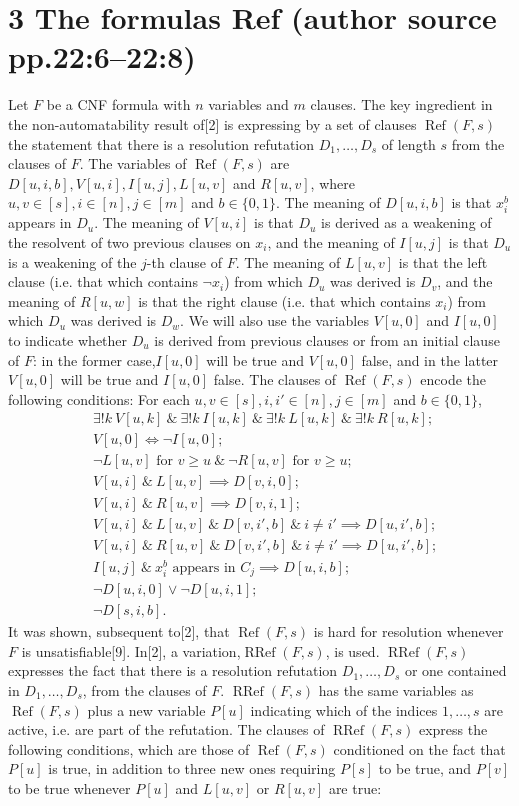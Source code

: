 \documentclass[10pt,a4paper]{article}
\newcommand{\RRef}{\operatorname{RRef}}
\renewcommand{\Ref}{\operatorname{Ref}}
\newcommand{\bits}{\{0,1\}}
\begin{document}
\section*{3 The formulas Ref (author source pp.22:6--22:8)}
Let $F$ be a CNF formula with $n$ variables and $m$ clauses. The key ingredient in the non-automatability result of[2] is expressing by a set of clauses $\Ref(F,s)$ the statement that there is a resolution refutation $D_1,\ldots,D_s$ of length $s$ from the clauses of $F$.
The variables of $\Ref(F,s)$ are $D[u,i,b],V[u,i],I[u,j],L[u,v]$ and $R[u,v]$, where $u,v\in[s],i\in[n],j\in[m]$ and $b\in\bits$. The meaning of $D[u,i,b]$ is that $x_i^b$ appears in $D_u$. The meaning of $V[u,i]$ is that $D_u$ is derived as a weakening of the resolvent of two previous clauses on $x_i$, and the meaning of $I[u,j]$ is that $D_u$ is a weakening of the $j$-th clause of $F$. The meaning of $L[u,v]$ is that the left clause (i.e. that which contains $\neg x_i$) from which $D_u$ was derived is $D_v$, and the meaning of $R[u,w]$ is that the right clause (i.e. that which contains $x_i$) from which $D_u$ was derived is $D_w$. We will also use the variables $V[u,0]$ and $I[u,0]$ to indicate whether $D_u$ is derived from previous clauses or from an initial clause of $F$: in the former case,$I[u,0]$ will be true and $V[u,0]$ false, and in the latter $V[u,0]$ will be true and $I[u,0]$ false. The clauses of $\Ref(F,s)$ encode the following conditions: For each $u,v\in[s],i,i'\in[n],j\in[m]$ and $b\in\bits$,
\begin{align*}
&\exists!k\ V[u,k]\ \&\ \exists!k\ I[u,k]\ \&\ \exists!k\ L[u,k]\ \&\ \exists!k\ R[u,k];\tag{3.1}\\
&V[u,0]\iff\neg I[u,0];\tag{3.2}\\
&\neg L[u,v]\text{ for }v\ge u\ \&\ \neg R[u,v]\text{ for }v\ge u;\tag{3.3}\\
&V[u,i]\ \&\ L[u,v]\implies D[v,i,0];\tag{3.4}\\
&V[u,i]\ \&\ R[u,v]\implies D[v,i,1];\tag{3.5}\\
&V[u,i]\ \&\ L[u,v]\ \&\ D[v,i',b]\ \&\ i\ne i'\implies D[u,i',b];\tag{3.6}\\
&V[u,i]\ \&\ R[u,v]\ \&\ D[v,i',b]\ \&\ i\ne i'\implies D[u,i',b];\tag{3.7}\\
&I[u,j]\ \&\ x_i^b\text{ appears in }C_j\implies D[u,i,b];\tag{3.8}\\
&\neg D[u,i,0]\vee\neg D[u,i,1];\tag{3.9}\\
&\neg D[s,i,b].\tag{3.10}
\end{align*}
It was shown, subsequent to[2], that $\Ref(F,s)$ is hard for resolution whenever $F$ is unsatisfiable[9]. In[2], a variation,$\RRef(F,s)$, is used. $\RRef(F,s)$ expresses the fact that there is a resolution refutation $D_1,\ldots,D_s$ or one contained in $D_1,\ldots,D_s$, from the clauses of $F$. $\RRef(F,s)$ has the same variables as $\Ref(F,s)$ plus a new variable $P[u]$ indicating which of the indices $1,\ldots,s$ are active, i.e. are part of the refutation. The clauses of $\RRef(F,s)$ express the following conditions, which are those of $\Ref(F,s)$ conditioned on the fact that $P[u]$ is true, in addition to three new ones requiring $P[s]$ to be true, and $P[v]$ to be true whenever $P[u]$ and $L[u,v]$ or $R[u,v]$ are true:
\end{document}
